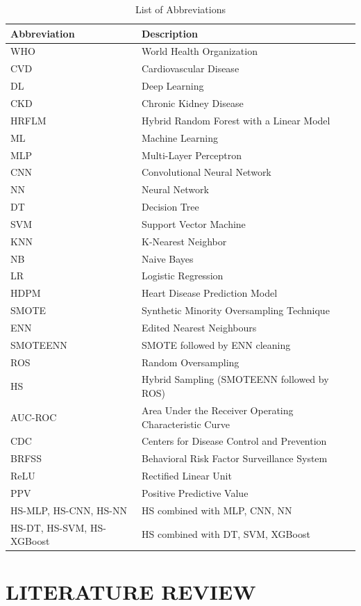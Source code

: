 \documentclass[11pt,a4paper]{article}
\begin{document}
\begin{table}[t]
\centering
\caption{List of Abbreviations}
\label{tab:abbrev}
\small
\begin{tabular}{ll}
\toprule
Abbreviation & Description \\
\midrule
WHO & World Health Organization \\
CVD & Cardiovascular Disease \\
DL & Deep Learning \\
CKD & Chronic Kidney Disease \\
HRFLM & Hybrid Random Forest with a Linear Model \\
ML & Machine Learning \\
MLP & Multi-Layer Perceptron \\
CNN & Convolutional Neural Network \\
NN & Neural Network \\
DT & Decision Tree \\
SVM & Support Vector Machine \\
KNN & K-Nearest Neighbor \\
NB & Naive Bayes \\
LR & Logistic Regression \\
HDPM & Heart Disease Prediction Model \\
SMOTE & Synthetic Minority Oversampling Technique \\
ENN & Edited Nearest Neighbours \\
SMOTEENN & SMOTE followed by ENN cleaning \\
ROS & Random Oversampling \\
HS & Hybrid Sampling (SMOTEENN followed by ROS) \\
AUC-ROC & Area Under the Receiver Operating Characteristic Curve \\
CDC & Centers for Disease Control and Prevention \\
BRFSS & Behavioral Risk Factor Surveillance System \\
ReLU & Rectified Linear Unit \\
PPV & Positive Predictive Value \\
HS-MLP, HS-CNN, HS-NN & HS combined with MLP, CNN, NN \\
HS-DT, HS-SVM, HS-XGBoost & HS combined with DT, SVM, XGBoost \\
\bottomrule
\end{tabular}
\end{table}

\section{LITERATURE REVIEW}
\label{sec:lit}
\end{document}
